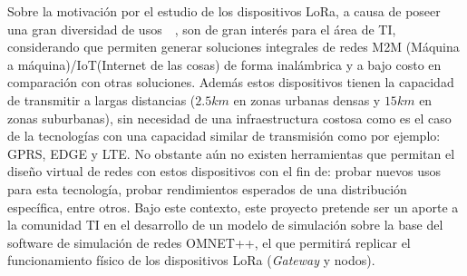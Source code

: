 \begin{justify}
Sobre la motivación por el estudio de los dispositivos LoRa, a causa de poseer una gran diversidad de usos~\cite{use1}~\cite{use2}, son de gran interés para el área de TI, considerando que permiten generar soluciones integrales de redes M2M (Máquina a máquina)/IoT(Internet de las cosas) de forma inalámbrica y a bajo costo en comparación con otras soluciones. Además estos dispositivos tienen la capacidad de transmitir a largas distancias ($2.5 km$ en zonas urbanas densas y $15 km$ en zonas suburbanas), sin necesidad de una infraestructura costosa como es el caso de la tecnologías con una capacidad similar de transmisión como por ejemplo: GPRS, EDGE y LTE. No obstante aún no existen herramientas que permitan el diseño virtual de redes con estos dispositivos con el fin de: probar nuevos usos para esta tecnología, probar rendimientos esperados de una distribución específica, entre otros. Bajo este contexto, este proyecto pretende ser un aporte a la comunidad TI en el desarrollo de un modelo de simulación sobre la base del software de simulación de redes OMNET++, el que permitirá replicar el funcionamiento físico de los dispositivos LoRa (\textit{Gateway} y nodos).

\end{justify}
